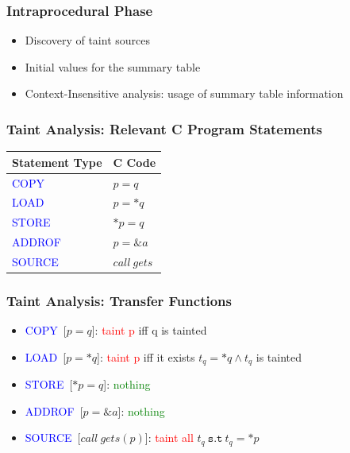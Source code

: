 \documentclass[xcolor=dvipsnames]{beamer}
\begin{document}
\begin{frame}
  \frametitle{Intraprocedural Phase} 
	{\large
	\begin{itemize}
	\item Discovery of taint sources
   	\vspace{0.5cm}		
	\item Initial values for the summary table
   	\vspace{0.5cm}		   	
	\item Context-Insensitive analysis: usage of summary table information
	\end{itemize}
}
\end{frame}

\begin{frame}
  \frametitle{Taint Analysis: Relevant C Program Statements} 
	\Large
\begin{center}
\begin{tabular}{|l|l|}
\hline
Statement Type 				& C Code 			\\ \hline
\hline
\textcolor{blue}{COPY}		& $p = q$				\\	\hline
\textcolor{blue}{LOAD}		& $p = *q$				\\ 	\hline
\textcolor{blue}{STORE}		& $*p = q$				\\ 	\hline
\textcolor{blue}{ADDROF}	& $p = \&a$				\\ 	\hline
\textcolor{blue}{SOURCE}	& $\mathit{call\ gets}  $ \\ 	\hline
\end{tabular}
\end{center}    	
\end{frame}

\begin{frame}
  \frametitle{Taint Analysis: Transfer Functions} 
	{\large
	\begin{itemize}
	\item \textcolor{blue}{COPY}\ [$p = q$]: \textcolor{red}{taint p} iff q is tainted
   	\vspace{0.2cm}	
	\item \textcolor{blue}{LOAD}\ [$p = *q$]: \textcolor{red}{taint p} iff it exists $t_q = *q \wedge t_q$ is tainted
   	\vspace{0.2cm}		
	\item \textcolor{blue}{STORE}\ [$*p = q$]: \textcolor{green}{nothing}
   	\vspace{0.2cm}		
	\item \textcolor{blue}{ADDROF}\	[$p = \&a$]: \textcolor{green}{nothing}
   	\vspace{0.2cm}		
	\item \textcolor{blue}{SOURCE}\	 [$\mathit{call\ gets(p)}$]: \textcolor{red}{taint all} $t_q\ \mathtt{s.t}\ t_q = *p$ 
	\end{itemize}
}
\end{frame}
\end{document}
